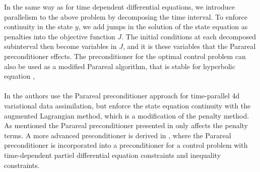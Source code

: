 In the same way as for time dependent differential equations, we introduce parallelism to the above problem by decomposing the time interval. To enforce continuity in the state $y$, we add jumps in the solution of the state equation as penalties into the objective function $J$. The initial conditions at each decomposed subinterval then become variables in $J$, and it is these variables that the Parareal preconditioner effects. The preconditioner for the optimal control problem can also be used as a modified Parareal algorithm, that is stable for hyperbolic equation \cite{chen2015adjoint},
\\
\\
In \cite{rao2016time} the authors use the Parareal preconditioner approach for time-parallel 4d variational data assimilation, but enforce the state equation continuity with the augmented Lagrangian method, which is a modification of the penalty method\cite{nocedal2006numerical}. As mentioned the Parareal preconditioner presented in \cite{maday2002parareal} only affects the penalty terms. A more advanced preconditioner is derived in \cite{ulbrich2015preconditioners}, where the Parareal preconditioner is incorporated into a preconditioner for a control problem with time-dependent partiel differential equation constraints and inequality constraints.
